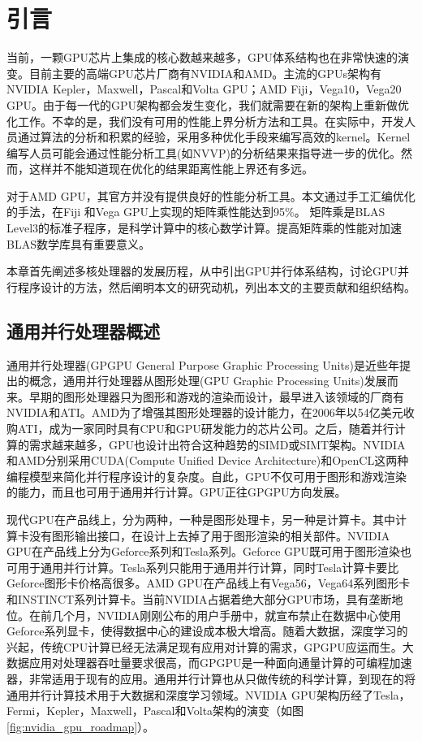 \chapter{引言}\label{chap:introduction}
当前，一颗GPU芯片上集成的核心数越来越多，GPU体系结构也在非常快速的演变。目前主要的高端GPU芯片厂商有NVIDIA和AMD。主流的GPUs架构有NVIDIA Kepler，Maxwell，Pascal和Volta GPU；AMD Fiji，Vega10，Vega20 GPU。由于每一代的GPU架构都会发生变化，我们就需要在新的架构上重新做优化工作。不幸的是，我们没有可用的性能上界分析方法和工具。在实际中，开发人员通过算法的分析和积累的经验，采用多种优化手段来编写高效的kernel。Kernel编写人员可能会通过性能分析工具(如NVVP)的分析结果来指导进一步的优化。然而，这样并不能知道现在优化的结果距离性能上界还有多远。

对于AMD GPU，其官方并没有提供良好的性能分析工具。本文通过手工汇编优化的手法，在Fiji 和Vega GPU上实现的矩阵乘性能达到95\%。
矩阵乘是BLAS Level3的标准子程序，是科学计算中的核心数学计算。提高矩阵乘的性能对加速BLAS数学库具有重要意义。

本章首先阐述多核处理器的发展历程，从中引出GPU并行体系结构，讨论GPU并行程序设计的方法，然后阐明本文的研究动机，列出本文的主要贡献和组织结构。

\section{通用并行处理器概述}

通用并行处理器(GPGPU General Purpose Graphic Processing Units)是近些年提出的概念，通用并行处理器从图形处理(GPU Graphic Processing Units)发展而来。早期的图形处理器只为图形和游戏的渲染而设计，最早进入该领域的厂商有NVIDIA和ATI。AMD为了增强其图形处理器的设计能力，在2006年以54亿美元收购ATI，成为一家同时具有CPU和GPU研发能力的芯片公司。之后，随着并行计算的需求越来越多，GPU也设计出符合这种趋势的SIMD或SIMT架构。NVIDIA和AMD分别采用CUDA(Compute Unified Device Architecture)和OpenCL这两种编程模型来简化并行程序设计的复杂度。自此，GPU不仅可用于图形和游戏渲染的能力，而且也可用于通用并行计算。GPU正往GPGPU方向发展。

现代GPU在产品线上，分为两种，一种是图形处理卡，另一种是计算卡。其中计算卡没有图形输出接口，在设计上去掉了用于图形渲染的相关部件。NVIDIA GPU在产品线上分为Geforce系列和Tesla系列。Geforce GPU既可用于图形渲染也可用于通用并行计算。Tesla系列只能用于通用并行计算，同时Tesla计算卡要比Geforce图形卡价格高很多。AMD GPU在产品线上有Vega56，Vega64系列图形卡和INSTINCT系列计算卡。当前NVIDIA占据着绝大部分GPU市场，具有垄断地位。在前几个月，NVIDIA刚刚公布的用户手册中，就宣布禁止在数据中心使用Geforce系列显卡，使得数据中心的建设成本极大增高。随着大数据，深度学习的兴起，传统CPU计算已经无法满足现有应用对计算的需求，GPGPU应运而生。大数据应用对处理器吞吐量要求很高，而GPGPU是一种面向通量计算的可编程加速器，非常适用于现有的应用。通用并行计算也从只做传统的科学计算，到现在的将通用并行计算技术用于大数据和深度学习领域。NVIDIA GPU架构历经了Tesla，Fermi，Kepler，Maxwell，Pascal和Volta架构的演变（如图\ref{fig:nvidia_gpu_roadmap}）。

